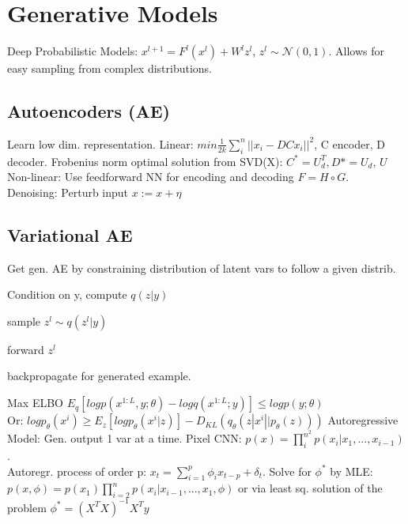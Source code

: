 \section{Generative Models}
Deep Probabilistic Models: $x^{l+1} = F^l(x^l) + W^l z^l$, $z^{l}\sim \mathcal{N}(0,1)$. Allows for easy sampling from complex distributions.
\subsection{Autoencoders (AE)}
Learn low dim. representation. 
Linear: $min \frac{1}{2k} \sum_{i}^n ||x_i - DCx_i||^2$, C encoder, D decoder. Frobenius norm optimal solution from SVD(X): $C^*=U_d^T, D*=U_d$, $U$
Non-linear: Use feedforward NN for encoding and decoding $F = H \circ G$. \\
Denoising: Perturb input $x := x + \eta$
\subsection{Variational AE}
Get gen. AE by constraining distribution of latent vars to follow a given distrib.
\begin{inparaenum}
	\item Condition on y, compute $q(z|y)$
	\item sample $z^l \sim q(z^l|y)$
	\item forward $z^l$
	\item backpropagate for generated example.
\end{inparaenum}
Max ELBO $E_q[log p(x^{1:L},y;\theta) - log q(x^{1:L};y)] \leq log p (y;\theta)$ \\
Or: $log p_\theta(x^{i}) \geq E_z[log p_\theta(x^{i}|z)] - D_{KL}(q_\theta(z|x^{i}||p_\theta(z)))$
Autoregressive Model: Gen. output 1 var at a time. 
Pixel CNN: $p(x) = \prod_i^{n^2} p(x_i|x_1,...,x_{i-1})$. \\
Autoregr. process of order p: $x_t = \sum_{i=1}^p \phi_i x_{t-p} + \delta_t$.
Solve for $\phi^*$ by MLE: $p(x, \phi) = p(x_1)\prod_{i=2}^n p(x_i|x_{i-1},...,x_1,\phi)$ or via least sq. solution of the problem $\phi^* = (X^TX)^{-1}X^Ty$